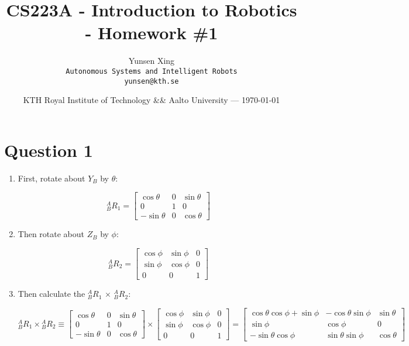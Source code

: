 \documentclass{article}
\title{CS223A - Introduction to Robotics - Homework \#1} %
\author{Yunsen Xing \\
\texttt{Autonomous Systems and Intelligent Robots} \\
\texttt{yunsen@kth.se}} %
\date{KTH Royal Institute of Technology \&\& Aalto University --- \today}
\begin{document}
\maketitle %


\section*{Question 1} %

\begin{enumerate}

  \item First, rotate about $Y_B$ by $\theta$:
  
  \[
    {}^{A}_{B}R_{1} =
    \begin{bmatrix}
        \cos{\theta} & 0 & \sin{\theta} \\
        0 & 1 & 0 \\
        -\sin{\theta} & 0 & \cos{\theta}
    \end{bmatrix}
  \]
  
  \item Then rotate about $Z_B$ by $\phi:$
  
  \[
    {}^{A}_{B}R_{2} = 
    \begin{bmatrix}
        \cos{\phi} & \sin{\phi} & 0 \\
        \sin{\phi} & \cos{\phi} & 0 \\
        0 & 0 & 1
    \end{bmatrix}
  \]

  \item Then calculate the ${}^{A}_{B}R_{1}$ $\times$ ${}^{A}_{B}R_{2}$:
  
  \[
  {}^{A}_{B}R_{1} \times {}^{A}_{B}R_{2} \equiv 
    \begin{bmatrix}
        \cos{\theta} & 0 & \sin{\theta} \\
        0 & 1 & 0 \\
        -\sin{\theta} & 0 & \cos{\theta}
    \end{bmatrix}
    \times
    \begin{bmatrix}
        \cos{\phi} & \sin{\phi} & 0 \\
        \sin{\phi} & \cos{\phi} & 0 \\
        0 & 0 & 1
    \end{bmatrix}  
    =
    \begin{bmatrix}
        \cos{\theta}\cos{\phi} + \sin{\phi} & -\cos{\theta}\sin{\phi} & \sin{\theta} \\
        \sin{\phi} & \cos{\phi} & 0 \\
        -\sin{\theta}\cos{\phi} & \sin{\theta}\sin{\phi} & \cos{\theta}
    \end{bmatrix}
  \]
\end{enumerate}
\end{document}
